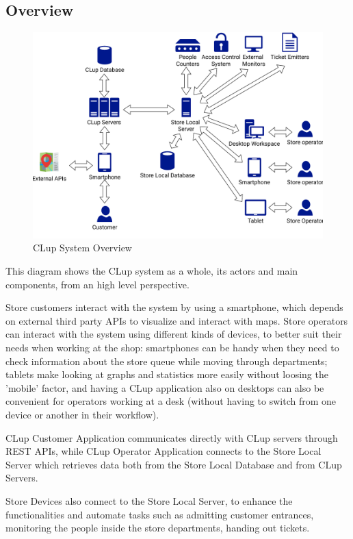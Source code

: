 \subsection{Overview}
\begin{figure}[H]
    \centering
    \includegraphics[scale=0.6]{Images/overview.pdf}
    \caption{\label{fig:Overview} CLup System Overview}
\end{figure}

This diagram shows the CLup system as a whole, its actors and main components, from an high level perspective.

Store customers interact with the system by using a smartphone, which depends on external third party APIs to visualize and interact with maps.
Store operators can interact with the system using different kinds of devices, to better suit their needs when working at the shop: smartphones can be handy when they need to check information about the store queue while moving through departments; tablets make looking at graphs and statistics more easily without loosing the 'mobile' factor, and having a CLup application also on desktops can also be convenient for operators working at a desk (without having to switch from one device or another in their workflow).

CLup Customer Application communicates directly with CLup servers through REST APIs, while CLup Operator Application connects to the Store Local Server which retrieves data both from the Store Local Database and from CLup Servers.

Store Devices also connect to the Store Local Server, to enhance the functionalities and automate tasks such as admitting customer entrances, monitoring the people inside the store departments, handing out tickets.

